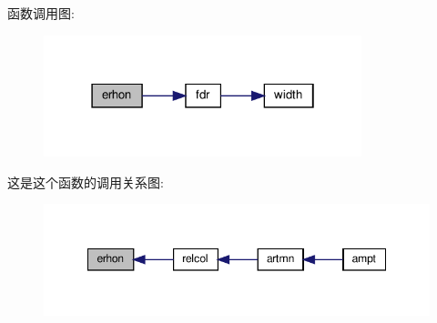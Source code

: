 函数调用图\+:
\nopagebreak
\begin{figure}[H]
\begin{center}
\leavevmode
\includegraphics[width=262pt]{erhon_8f90_a217764fb6b7f1be79b168bf9d7a7040c_cgraph}
\end{center}
\end{figure}
这是这个函数的调用关系图\+:
\nopagebreak
\begin{figure}[H]
\begin{center}
\leavevmode
\includegraphics[width=348pt]{erhon_8f90_a217764fb6b7f1be79b168bf9d7a7040c_icgraph}
\end{center}
\end{figure}
